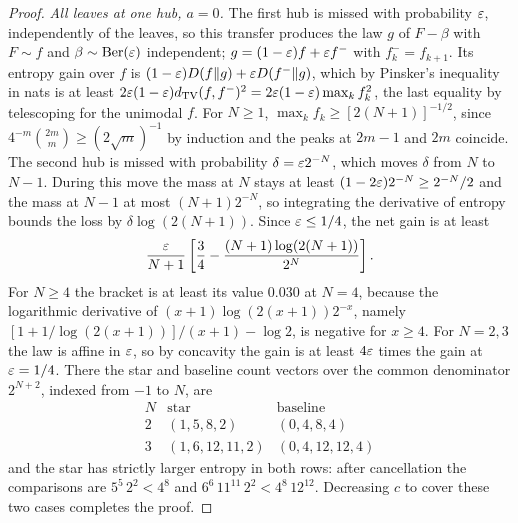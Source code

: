 \documentclass[11pt,a4paper]{article}
\theoremstyle{definition}\newtheorem{remark}[theorem]{Remark}\newtheorem{conjecture}{Conjecture}
\begin{document}
\begin{proof}
\emph{All leaves at one hub, $a=0$.} The first hub is missed with probability $\varepsilon$, independently of the leaves, so this transfer produces the law $g$ of $F-\beta$ with $F\sim f$ and $\beta\sim{\rm Ber}(\varepsilon)$ independent; $g=(1-\varepsilon)f+\varepsilon f^-$ with $f^-_k=f_{k+1}$. Its entropy gain over $f$ is $(1-\varepsilon)D(f\Vert g)+\varepsilon D(f^-\Vert g)$, which by Pinsker's inequality in nats is at least $2\varepsilon(1-\varepsilon)d_{\rm TV}(f,f^-)^2=2\varepsilon(1-\varepsilon)\max_kf_k^2$, the last equality by telescoping for the unimodal $f$. For $N\ge1$, $\max_kf_k\ge[2(N+1)]^{-1/2}$, since $4^{-m}\binom{2m}m\ge(2\sqrt m)^{-1}$ by induction and the peaks at $2m-1$ and $2m$ coincide. The second hub is missed with probability $\delta=\varepsilon2^{-N}$, which moves $\delta$ from $N$ to $N-1$. During this move the mass at $N$ stays at least $(1-2\varepsilon)2^{-N}\ge2^{-N}/2$ and the mass at $N-1$ at most $(N+1)2^{-N}$, so integrating the derivative of entropy bounds the loss by $\delta\log(2(N+1))$. Since $\varepsilon\le1/4$, the net gain is at least
\[
 \frac{\varepsilon}{N+1}\left[\frac34-\frac{(N+1)\log(2(N+1))}{2^N}\right].
\]
For $N\ge4$ the bracket is at least its value $0.030$ at $N=4$, because the logarithmic derivative of $(x+1)\log(2(x+1))2^{-x}$, namely $[1+1/\log(2(x+1))]/(x+1)-\log 2$, is negative for $x\ge4$. For $N=2,3$ the law is affine in $\varepsilon$, so by concavity the gain is at least $4\varepsilon$ times the gain at $\varepsilon=1/4$. There the star and baseline count vectors over the common denominator $2^{N+2}$, indexed from $-1$ to $N$, are
\[
\begin{array}{c|c|c}
N &\text{star}&\text{baseline}\\ \hline
2 &(1,5,8,2)&(0,4,8,4)\\
3 &(1,6,12,11,2)&(0,4,12,12,4)
\end{array}
\]
and the star has strictly larger entropy in both rows: after cancellation the comparisons are $5^5\,2^2<4^8$ and $6^6\,11^{11}\,2^2<4^8\,12^{12}$. Decreasing $c$ to cover these two cases completes the proof.
\end{proof}
\end{document}
